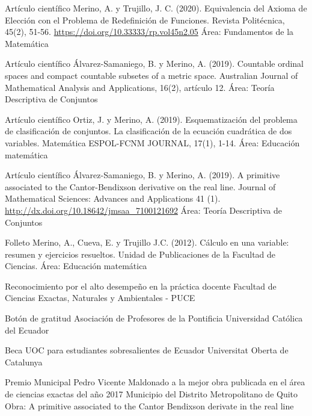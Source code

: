 \documentclass[
	a4paper,
	maincolor=cvblue!70!blue,
	sidecolor=gray!30,
	sectioncolor=cvblue!70!blue,
    sidebarwidth=7.5cm,
	topbottommargin=20pt,
	leftrightmargin=20pt,
]{fortysecondscv}
\begin{document}
    {Artículo científico}
    {Merino, A. y Trujillo, J. C. (2020). Equivalencia del Axioma de Elección con el Problema de Redefinición de Funciones. Revista Politécnica, 45(2), 51-56.}     {\url{https://doi.org/10.33333/rp.vol45n2.05}}
    {Área: Fundamentos de la Matemática}
    
    {Artículo científico}
    {Álvarez-Samaniego, B. y Merino, A. (2019). Countable ordinal spaces and compact countable subsetes of a metric space. Australian Journal of Mathematical Analysis and Applications, 16(2), artículo 12.}
    {}
    {Área: Teoría Descriptiva de Conjuntos}
    
    {Artículo científico}
    {Ortiz, J. y Merino, A. (2019). Esquematización del problema de clasificación de conjuntos. La clasificación de la ecuación cuadrática de dos variables. Matemática ESPOL-FCNM JOURNAL, 17(1), 1-14.}
    {}
    {Área: Educación matemática}
    
    {Artículo científico}
    {Álvarez-Samaniego, B. y Merino, A. (2019). A primitive associated to the Cantor-Bendixson derivative on the real line. Journal of Mathematical Sciences: Advances and Applications 41 (1).}     
    {\url{http://dx.doi.org/10.18642/jmsaa_7100121692}}
    {Área: Teoría Descriptiva de Conjuntos}
    
    {Folleto}
    {Merino, A., Cueva, E. y Trujillo J.C. (2012). Cálculo en una variable: resumen y ejercicios resueltos. Unidad de Publicaciones de la Facultad de Ciencias.}
    {}
    {Área: Educación matemática}
    


    {Reconocimiento por el alto desempeño en la práctica docente}
    {Facultad de Ciencias Exactas, Naturales y Ambientales - PUCE}
    {}

    {Botón de gratitud}
    {Asociación de Profesores de la Pontificia Universidad Católica del Ecuador}
    {}

    {Beca UOC para estudiantes sobresalientes de Ecuador}
    {Universitat Oberta de Catalunya}
    {}
    
    {Premio Municipal Pedro Vicente Maldonado a la mejor obra publicada en el área de ciencias exactas del año 2017}
    {Municipio del Distrito Metropolitano de Quito}
    {Obra: A primitive associated to the Cantor Bendixson derivate in the real line}
    

\end{document}
